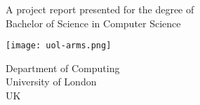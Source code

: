 \makeatletter
\begin{titlepage}
   \begin{center}
       \vspace*{1cm}

       \Huge
       \textbf{\projectTitle}

       \vspace{0.5cm}
       \Large
       \projectSubtitle
            
       \vspace{1.5cm}

       \textbf{\projectAuthor}

       \vfill
            
       A project report presented for the degree of\\
       Bachelor of Science in Computer Science
            
       \vspace{0.8cm}
     
       \texttt{[image: uol-arms.png]}
            
       \Large
       Department of Computing\\
       University of London\\
       UK\\
       \projectDate
       
   \end{center}
\end{titlepage}
\makeatother
